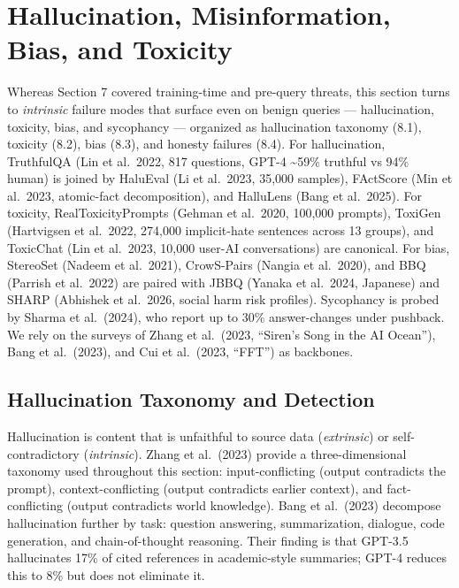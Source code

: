 \section{Hallucination, Misinformation, Bias, and Toxicity}\label{hallucination-misinformation-bias-and-toxicity}

Whereas Section 7 covered training-time and pre-query threats, this section turns to \emph{intrinsic} failure modes that surface even on benign queries --- hallucination, toxicity, bias, and sycophancy --- organized as hallucination taxonomy (8.1), toxicity (8.2), bias (8.3), and honesty failures (8.4). For hallucination, TruthfulQA (Lin et al.~2022, 817 questions, GPT-4 \textasciitilde59\% truthful vs 94\% human) is joined by HaluEval (Li et al.~2023, 35,000 samples), FActScore (Min et al.~2023, atomic-fact decomposition), and HalluLens (Bang et al.~2025). For toxicity, RealToxicityPrompts (Gehman et al.~2020, 100,000 prompts), ToxiGen (Hartvigsen et al.~2022, 274,000 implicit-hate sentences across 13 groups), and ToxicChat (Lin et al.~2023, 10,000 user-AI conversations) are canonical. For bias, StereoSet (Nadeem et al.~2021), CrowS-Pairs (Nangia et al.~2020), and BBQ (Parrish et al.~2022) are paired with JBBQ (Yanaka et al.~2024, Japanese) and SHARP (Abhishek et al.~2026, social harm risk profiles). Sycophancy is probed by Sharma et al.~(2024), who report up to 30\% answer-changes under pushback. We rely on the surveys of Zhang et al.~(2023, ``Siren's Song in the AI Ocean''), Bang et al.~(2023), and Cui et al.~(2023, ``FFT'') as backbones.

\subsection{Hallucination Taxonomy and Detection}\label{hallucination-taxonomy-and-detection}

Hallucination is content that is unfaithful to source data (\emph{extrinsic}) or self-contradictory (\emph{intrinsic}). Zhang et al.~(2023) provide a three-dimensional taxonomy used throughout this section: input-conflicting (output contradicts the prompt), context-conflicting (output contradicts earlier context), and fact-conflicting (output contradicts world knowledge). Bang et al.~(2023) decompose hallucination further by task: question answering, summarization, dialogue, code generation, and chain-of-thought reasoning. Their finding is that GPT-3.5 hallucinates 17\% of cited references in academic-style summaries; GPT-4 reduces this to 8\% but does not eliminate it.

